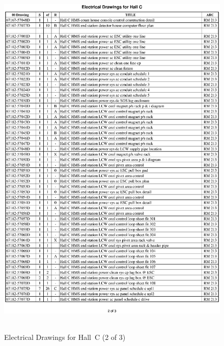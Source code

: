 \clearpage
\begin{figure}
\begin{center}
\includegraphics[height=7in]{ele2p.ps}
\caption{Electrical Drawings for Hall~C (2 of 3)}
\label{fig:elect_dwgs2}
\end{center}
\end{figure}

